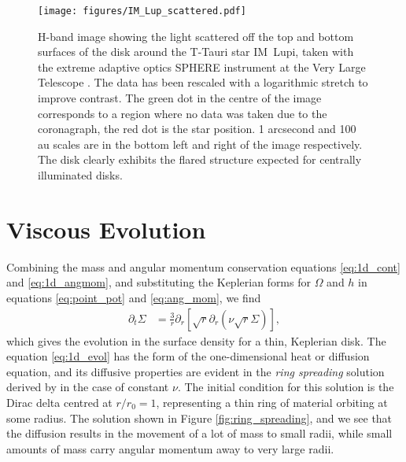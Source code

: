 \begin{figure}
    \centering
    \texttt{[image: figures/IM\_Lup\_scattered.pdf]}
    \caption{H-band image showing the light scattered off the top and bottom surfaces of the disk around the T-Tauri star IM~Lupi, taken with the extreme adaptive optics SPHERE instrument at the Very Large Telescope \citep{avenhaus2018}.
    The data has been rescaled with a logarithmic stretch to improve contrast.
    The green dot in the centre of the image corresponds to a region where no data was taken due to the coronagraph, the red dot is the star position.
    1 arcsecond and 100 au scales are in the bottom left and right of the image respectively.
    The disk clearly exhibits the flared structure expected for centrally illuminated disks.}
    \label{fig:im_lup}
\end{figure}

\section{Viscous Evolution}

Combining the mass and angular momentum conservation equations \ref{eq:1d_cont} and \ref{eq:1d_angmom}, and substituting the Keplerian forms for $\Omega$ and $h$ in equations \ref{eq:point_pot} and \ref{eq:ang_mom}, we find
\begin{align}
    \partial_t \Sigma &= \frac{3}{r} \partial_r \left[ \sqrt{r} \partial_r \left( \nu \sqrt{r} \Sigma  \right)  \right] \label{eq:1d_evol},
\end{align}
which gives the evolution in the surface density for a thin, Keplerian disk.
The equation \ref{eq:1d_evol} has the form of the one-dimensional heat or diffusion equation, and its diffusive properties are evident in the \textit{ring spreading} solution derived by \citet{lynden-bell1974} in the case of constant $\nu$.
The initial condition for this solution is the Dirac delta centred at $r/r_0 = 1$, representing a thin ring of material orbiting at some radius.
The solution shown in Figure \ref{fig:ring_spreading}, and we see that the diffusion results in the movement of a lot of mass to small radii, while small amounts of mass carry angular momentum away to very large radii.

